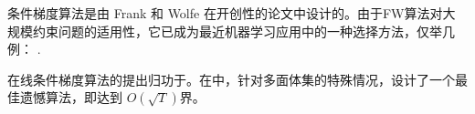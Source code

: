 条件梯度算法是由 Frank 和 Wolfe \cite{FrankWolfe} 在开创性的论文中设计的。由于FW算法对大规模约束问题的适用性，它已成为最近机器学习应用中的一种选择方法，仅举几例：
\cite{Jaggi10, Jaggi13a, Jaggi13b, Dudik12a, Dudik12b, Hazan12, ShalevShwartz11, Bach12, Tewari11, Garber11, Garber13, Florina14}.

在线条件梯度算法的提出归功于\cite{Hazan12}。在\cite{Garber13}中，针对多面体集的特殊情况，设计了一个最佳遗憾算法，即达到 $O(\sqrt{T})$界。
